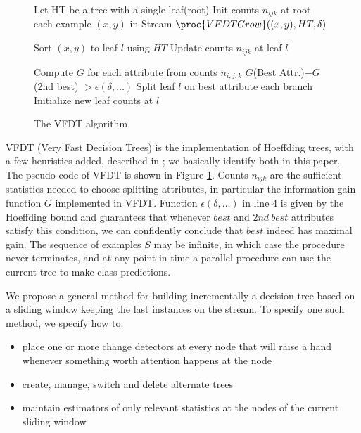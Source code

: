 \begin{figure}
\begin{codebox}
\li Let HT be a tree with a single leaf(root) 
\li  Init counts $n_{ijk}$ at root
\li \For each example $(x,y)$ in Stream 
\li \Do 
$\proc{VFDTGrow} ((x,y),HT, \delta)$ 
\End  \End
\end{codebox}

\begin{codebox}
\li  Sort $(x,y)$ to leaf $l$ using $HT$ 
\li  Update counts $n_{ijk}$ at leaf $l$

\li  Compute $G$ for each attribute from counts $n_{i,j,k}$
\li \If $G$(Best Attr.)$ - G$(2nd best) $> \epsilon(\delta,\dots)$ 
\li \Then
\li  Split leaf $l$ on best attribute
\li \For each branch
\li    \Do   Initialize new leaf counts at $l$
\End  \End %
\end{codebox}
\caption{The VFDT algorithm}
\label{fig:VFDT}
\end{figure}

VFDT (Very Fast Decision Trees) is the implementation of Hoeffding 
trees, with a few heuristics added, described in \cite{vfdt}; 
we basically identify both in this paper. 
The pseudo-code of VFDT is shown in Figure \ref{fig:VFDT}. 
Counts $n_{ijk}$ are the sufficient statistics needed to choose splitting attributes, 
in particular the information gain function $G$ implemented in VFDT.
Function $\epsilon(\delta,\dots)$ in line 4 
is given by the Hoeffding bound and guarantees that
whenever $best$ and $2nd\ best$ attributes satisfy this condition, 
we can confidently conclude that $best$ indeed has maximal gain. 
The sequence of examples $S$ may be infinite, in which case the procedure
never terminates, and at any point in time a parallel procedure can use the current tree 
to make class predictions.
\ENDOMIT
\label{HWTree}

We propose a general method for building incrementally a decision tree based on
a  sliding window keeping the last instances on the stream.
To specify one such method, we specify how to: 

\begin{itemize}
 \item place one or more change detectors at every node that will
raise a hand whenever something worth attention happens at the node
 \item create, manage, switch and delete alternate trees
 \item maintain estimators of only relevant statistics at the nodes of the current sliding window
\end{itemize}

